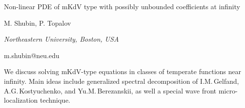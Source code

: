 \documentclass[10pt,a4paper]{article}
\begin{document}
\begin{center}

{\Large Non-linear PDE of mKdV type with possibly unbounded coefficients at infinity}

\bigskip

{\sc M. Shubin, P. Topalov}

{\small\it Northeastern University, Boston, USA}

{\small\rm m.shubin@neu.edu}

\end{center}

\bigskip

We discuss solving mKdV-type equations 
in classes of temperate functions near infinity.
Main ideas include generalized spectral decomposition
of I.M.\,Gelfand, A.G.\,Kostyuchenko, and Yu.M.\,Berezanskii, 
as well a special wave front micro-localization technique. 
\end{document}
